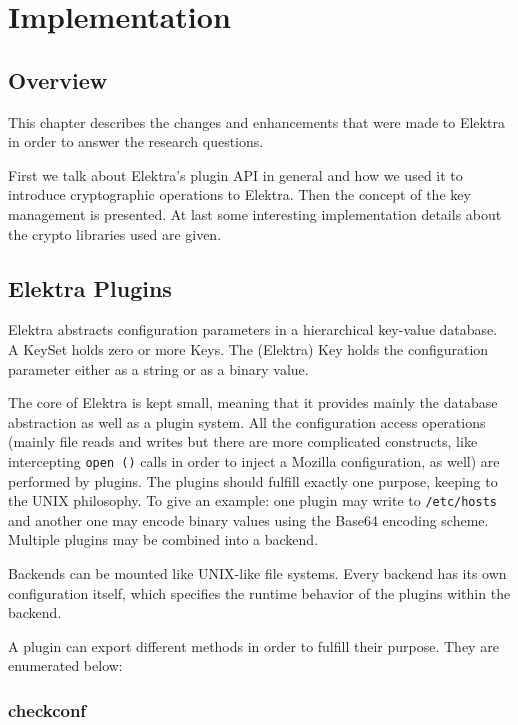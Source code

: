 \chapter{Implementation}

\section{Overview}

This chapter describes the changes and enhancements that were made to
Elektra in order to answer the research questions.

First we talk about Elektra's plugin API in general and how we used it
to introduce cryptographic operations to Elektra. Then the concept of
the key management is presented. At last some interesting implementation
details about the crypto libraries used are given.

\section{Elektra Plugins}\label{elektra-plugins}

Elektra abstracts configuration parameters in a hierarchical key-value
database. A KeySet holds zero or more Keys. The (Elektra) Key holds the
configuration parameter either as a string or as a binary value.

The core of Elektra is kept small, meaning that it provides mainly the
database abstraction as well as a plugin system. All the configuration
access operations (mainly file reads and writes but there are more
complicated constructs, like intercepting \texttt{open\ ()} calls in
order to inject a Mozilla configuration, as well) are performed by
plugins. The plugins should fulfill exactly one purpose, keeping to the
UNIX philosophy. To give an example: one plugin may write to
\texttt{/etc/hosts} and another one may encode binary values using the
Base64 encoding scheme. Multiple plugins may be combined into a backend.

Backends can be mounted like UNIX-like file systems. Every backend has
its own configuration itself, which specifies the runtime behavior of
the plugins within the backend.

A plugin can export different methods in order to fulfill their purpose.
They are enumerated below:

\subsection{checkconf}\label{checkconf}

